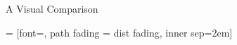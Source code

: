 \documentclass[11pt]{beamer}
\begin{document}
	\begin{frame}{A Visual Comparison}
		
		\tikzfading[name = dist fading,
		inner color = transparent!0,
		outer color = transparent!100]
		
		 = [font=\tiny, path fading = dist fading, inner sep=2em]
		
		
		\scriptsize
		\begin{columns}[t]
%			
%			
%					
%				
%					
%					
%		
%			
%			
%			
%					
%			
%			
%				
%			
%					
%					
%					
%				


\end{columns}
\end{frame}
\end{document}
